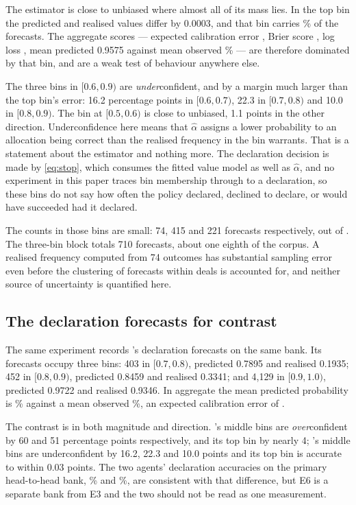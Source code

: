 The estimator is close to unbiased where almost all of its mass lies. In
the top bin the predicted and realised values differ by 0.0003, and that bin
carries \numDeclTopBinShare\% of the forecasts. The aggregate scores ---
expected calibration error \numDeclECE{}, Brier score \numDeclBrier{}, log loss
\numDeclLogLoss{}, mean predicted 0.9575 against mean observed
\numDeclObs\% --- are therefore dominated by that bin, and are a weak test of
behaviour anywhere else.

The three bins in $[0.6,0.9)$ are \emph{under}confident, and by a margin much
larger than the top bin's error: 16.2 percentage points in $[0.6,0.7)$, 22.3 in
$[0.7,0.8)$ and 10.0 in $[0.8,0.9)$. The bin at $[0.5,0.6)$ is close to
unbiased, 1.1 points in the other direction. Underconfidence here means that
$\hat\alpha$ assigns a lower probability to an allocation being correct than the
realised frequency in the bin warrants. That is a statement about the estimator
and nothing more. The declaration decision is made by \eqref{eq:stop}, which
consumes the fitted value model as well as $\hat\alpha$, and no experiment in
this paper traces bin membership through to a declaration, so these bins do not
say how often the policy declared, declined to declare, or would have succeeded
had it declared.

The counts in those bins are small: 74, 415 and 221 forecasts respectively, out
of \numDeclN{}. The three-bin block totals 710 forecasts, about one eighth of
the corpus. A realised frequency computed from 74 outcomes has substantial
sampling error even before the clustering of forecasts within deals is
accounted for, and neither source of uncertainty is quantified here.

\subsection{The \vthree{} declaration forecasts for contrast}
\label{app:calib-v03}

The same experiment records \vthree{}'s declaration forecasts on the same bank.
Its \numVthreeDeclN{} forecasts occupy three bins: 403 in $[0.7,0.8)$, predicted
0.7895 and realised 0.1935; 452 in $[0.8,0.9)$, predicted 0.8459 and realised
0.3341; and 4{,}129 in $[0.9,1.0)$, predicted 0.9722 and realised 0.9346. In
aggregate the mean predicted probability is \numVthreeDeclPred\% against a mean
observed \numVthreeDeclObs\%, an expected calibration error of
\numVthreeDeclECE{}.

The contrast is in both magnitude and direction. \vthree{}'s middle bins are
\emph{over}confident by 60 and 51 percentage points respectively, and its top
bin by nearly 4; \vfast{}'s middle bins are underconfident by 16.2, 22.3 and
10.0 points and its top bin is accurate to within 0.03 points. The two agents' declaration
accuracies on the primary head-to-head bank, \numVsVthreeDeclAcc\% and
\numVthreeDeclAccSame\%, are consistent with that difference, but E6 is a
separate bank from E3 and the two should not be read as one measurement.

